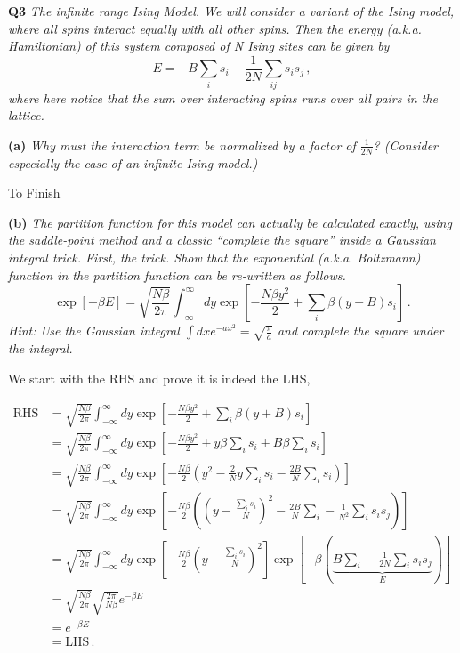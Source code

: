 \documentclass[10pt]{article}
\begin{document}
\textbf{Q3} \textit{The infinite range Ising Model. We will consider a variant of the Ising model, where all spins interact equally with all other spins. Then the energy (a.k.a. Hamiltonian) of this system composed of N Ising sites can be given by}
\[
E = -B\sum_{i}s_{i} - \frac{1}{2N}\sum_{ij}s_{i}s_{j}\, ,
\] 
\textit{where here notice that the sum over interacting spins runs over all pairs in the lattice.}

\textbf{(a)} \textit{Why must the interaction term be normalized by a factor of $\frac{1}{2N}$? (Consider especially the case of an infinite Ising model.)}

To Finish

\textbf{(b)} \textit{The partition function for this model can actually be calculated exactly, using the saddle-point method and a classic ``complete the square'' inside a Gaussian integral trick. First, the trick. Show that the exponential (a.k.a. Boltzmann) function in the partition function can be re-written as follows.}
\[
\exp[-\beta E] = \sqrt{\frac{N\beta}{2\pi}}\int_{-\infty}^{\infty}dy\exp\left[-\frac{N\beta y^{2}}{2} + \sum_{i}\beta(y + B)s_{i}\right]\, .
\]
\textit{Hint: Use the Gaussian integral $\int dxe^{-ax^{2}} = \sqrt{\frac{\pi}{a}}$ and complete the square under the integral.}

We start with the RHS and prove it is indeed the LHS,

\begin{align*}
  \text{RHS} & = \sqrt{\frac{N\beta}{2\pi}}\int_{-\infty}^{\infty}dy\exp\left[-\frac{N\beta y^{2}}{2} + \sum_{i}\beta(y + B)s_{i}\right]\\
  & = \sqrt{\frac{N\beta}{2\pi}}\int_{-\infty}^{\infty}dy\exp\left[-\frac{N\beta y^{2}}{2} + y\beta\sum_{i}s_{i} + B\beta\sum_{i}s_{i}\right]\\
  & = \sqrt{\frac{N\beta}{2\pi}}\int_{-\infty}^{\infty}dy\exp\left[-\frac{N\beta}{2}\left(y^{2} - \frac{2}{N}y\sum_{i}s_{i} - \frac{2B}{N}\sum_{i}s_{i}\right)\right] \\
  & = \sqrt{\frac{N\beta}{2\pi}}\int_{-\infty}^{\infty}dy\exp\left[-\frac{N\beta}{2}\left(\left(y - \frac{\sum_{i}s_{i}}{N}\right)^{2} - \frac{2B}{N}\sum_{i} - \frac{1}{N^{2}}\sum_{i}s_{i}s_{j}\right)\right]\\
  & = \sqrt{\frac{N\beta}{2\pi}}\int_{-\infty}^{\infty}dy\exp\left[-\frac{N\beta}{2}\left(y - \frac{\sum_{i}s_{i}}{N}\right)^{2}\right]\exp\left[ -\beta\left(\underbrace{B\sum_{i} - \frac{1}{2N}\sum_{i}s_{i}s_{j}}_{E}\right)\right]\\
  & = \sqrt{\frac{N\beta}{2\pi}}\sqrt{\frac{2\pi}{N\beta}}e^{-\beta E} \\
  & = e^{-\beta E} \\
  & = \text{LHS} \, .
\end{align*}
\end{document}
